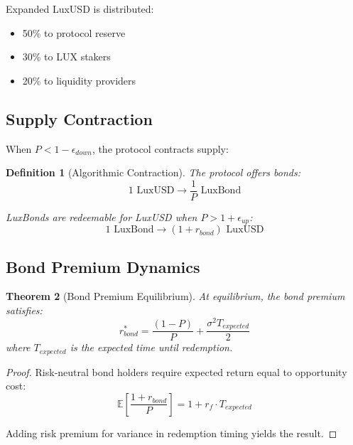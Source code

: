 \documentclass[11pt,a4paper]{article}
\newtheorem{theorem}{Theorem}
\newtheorem{definition}[theorem]{Definition}
\begin{document}
Expanded LuxUSD is distributed:
\begin{itemize}
    \item 50\% to protocol reserve
    \item 30\% to LUX stakers
    \item 20\% to liquidity providers
\end{itemize}

\subsection{Supply Contraction}

When $P < 1 - \epsilon_{down}$, the protocol contracts supply:

\begin{definition}[Algorithmic Contraction]
The protocol offers bonds:
\begin{equation}
    1 \text{ LuxUSD} \to \frac{1}{P} \text{ LuxBond}
\end{equation}

LuxBonds are redeemable for LuxUSD when $P > 1 + \epsilon_{up}$:
\begin{equation}
    1 \text{ LuxBond} \to (1 + r_{bond}) \text{ LuxUSD}
\end{equation}
\end{definition}

\subsection{Bond Premium Dynamics}

\begin{theorem}[Bond Premium Equilibrium]
At equilibrium, the bond premium satisfies:
\begin{equation}
    r_{bond}^* = \frac{(1 - P)}{P} + \frac{\sigma^2 T_{expected}}{2}
\end{equation}
where $T_{expected}$ is the expected time until redemption.
\end{theorem}

\begin{proof}
Risk-neutral bond holders require expected return equal to opportunity cost:
\begin{equation}
    \mathbb{E}\left[\frac{1 + r_{bond}}{P}\right] = 1 + r_f \cdot T_{expected}
\end{equation}

Adding risk premium for variance in redemption timing yields the result.
\end{proof}
\end{document}
